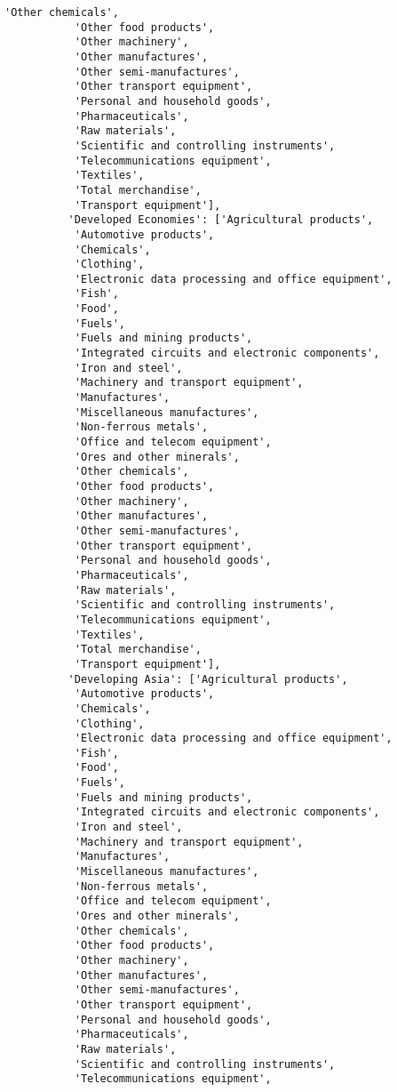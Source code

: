 \documentclass[11pt]{article}
\begin{document}
\begin{Verbatim}[commandchars=\\\{\}]
           'Other chemicals',
           'Other food products',
           'Other machinery',
           'Other manufactures',
           'Other semi-manufactures',
           'Other transport equipment',
           'Personal and household goods',
           'Pharmaceuticals',
           'Raw materials',
           'Scientific and controlling instruments',
           'Telecommunications equipment',
           'Textiles',
           'Total merchandise',
           'Transport equipment'],
          'Developed Economies': ['Agricultural products',
           'Automotive products',
           'Chemicals',
           'Clothing',
           'Electronic data processing and office equipment',
           'Fish',
           'Food',
           'Fuels',
           'Fuels and mining products',
           'Integrated circuits and electronic components',
           'Iron and steel',
           'Machinery and transport equipment',
           'Manufactures',
           'Miscellaneous manufactures',
           'Non-ferrous metals',
           'Office and telecom equipment',
           'Ores and other minerals',
           'Other chemicals',
           'Other food products',
           'Other machinery',
           'Other manufactures',
           'Other semi-manufactures',
           'Other transport equipment',
           'Personal and household goods',
           'Pharmaceuticals',
           'Raw materials',
           'Scientific and controlling instruments',
           'Telecommunications equipment',
           'Textiles',
           'Total merchandise',
           'Transport equipment'],
          'Developing Asia': ['Agricultural products',
           'Automotive products',
           'Chemicals',
           'Clothing',
           'Electronic data processing and office equipment',
           'Fish',
           'Food',
           'Fuels',
           'Fuels and mining products',
           'Integrated circuits and electronic components',
           'Iron and steel',
           'Machinery and transport equipment',
           'Manufactures',
           'Miscellaneous manufactures',
           'Non-ferrous metals',
           'Office and telecom equipment',
           'Ores and other minerals',
           'Other chemicals',
           'Other food products',
           'Other machinery',
           'Other manufactures',
           'Other semi-manufactures',
           'Other transport equipment',
           'Personal and household goods',
           'Pharmaceuticals',
           'Raw materials',
           'Scientific and controlling instruments',
           'Telecommunications equipment',

\end{Verbatim}
\end{document}
